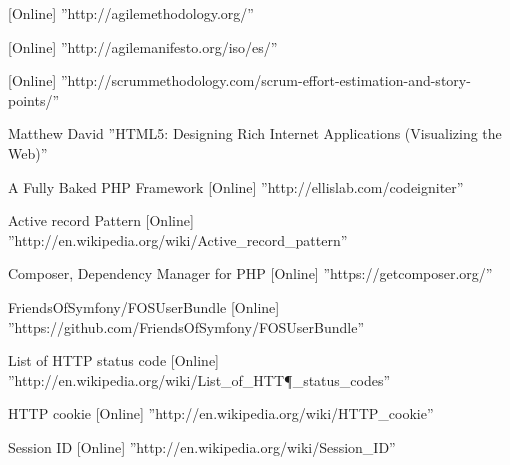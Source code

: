 \begin{thebibliography}{100}
 [Online] ''http://agilemethodology.org/''

 [Online] ''http://agilemanifesto.org/iso/es/''

 [Online] ''http://scrummethodology.com/scrum-effort-estimation-and-story-points/''

 Matthew David ''HTML5: Designing Rich Internet Applications (Visualizing the Web)''

 A Fully Baked PHP Framework [Online] ''http://ellislab.com/codeigniter''

 Active record Pattern [Online] ''http://en.wikipedia.org/wiki/Active_record_pattern''

 Composer, Dependency Manager for PHP [Online] ''https://getcomposer.org/''

 FriendsOfSymfony/FOSUserBundle [Online] ''https://github.com/FriendsOfSymfony/FOSUserBundle''

 List of HTTP status code [Online] ''http://en.wikipedia.org/wiki/List\_of\_HTT\P_status\_codes''

 HTTP cookie [Online] ''http://en.wikipedia.org/wiki/HTTP_cookie''

 Session ID [Online] ''http://en.wikipedia.org/wiki/Session_ID''
\end{thebibliography}

